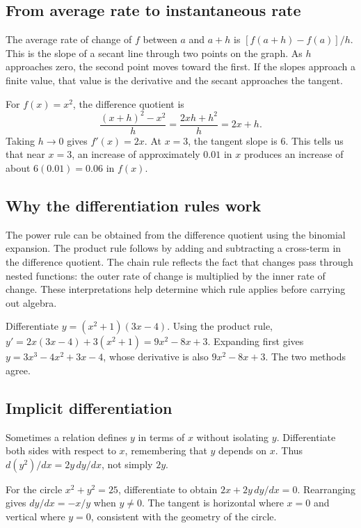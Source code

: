 \documentclass[12pt,a4paper]{article}
\begin{document}
\subsection{From average rate to instantaneous rate}
The average rate of change of $f$ between $a$ and $a+h$ is $[f(a+h)-f(a)]/h$. This is the slope of a secant line through two points on the graph. As $h$ approaches zero, the second point moves toward the first. If the slopes approach a finite value, that value is the derivative and the secant approaches the tangent.

\begin{exampleBox}For $f(x)=x^2$, the difference quotient is
\[
\frac{(x+h)^2-x^2}{h}=\frac{2xh+h^2}{h}=2x+h.
\]
Taking $h\to0$ gives $f'(x)=2x$. At $x=3$, the tangent slope is $6$. This tells us that near $x=3$, an increase of approximately $0.01$ in $x$ produces an increase of about $6(0.01)=0.06$ in $f(x)$.
\end{exampleBox}

\subsection{Why the differentiation rules work}
The power rule can be obtained from the difference quotient using the binomial expansion. The product rule follows by adding and subtracting a cross-term in the difference quotient. The chain rule reflects the fact that changes pass through nested functions: the outer rate of change is multiplied by the inner rate of change. These interpretations help determine which rule applies before carrying out algebra.

\begin{exampleBox}Differentiate $y=(x^2+1)(3x-4)$. Using the product rule, $y'=2x(3x-4)+3(x^2+1)=9x^2-8x+3$. Expanding first gives $y=3x^3-4x^2+3x-4$, whose derivative is also $9x^2-8x+3$. The two methods agree.
\end{exampleBox}

\subsection{Implicit differentiation}
Sometimes a relation defines $y$ in terms of $x$ without isolating $y$. Differentiate both sides with respect to $x$, remembering that $y$ depends on $x$. Thus $d(y^2)/dx=2y\,dy/dx$, not simply $2y$.

\begin{exampleBox}For the circle $x^2+y^2=25$, differentiate to obtain $2x+2y\,dy/dx=0$. Rearranging gives $dy/dx=-x/y$ when $y\ne0$. The tangent is horizontal where $x=0$ and vertical where $y=0$, consistent with the geometry of the circle.
\end{exampleBox}
\end{document}
